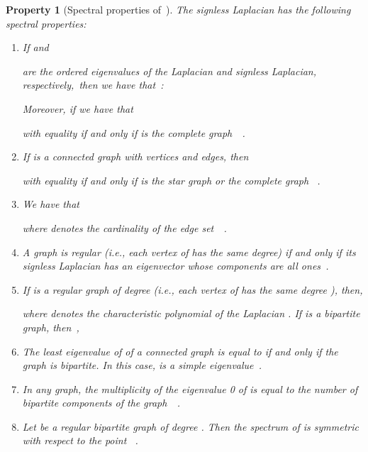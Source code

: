 \documentclass[letterpaper,9pt,twocolumn]{autart}
\newtheorem{property}{\textbf{Property}}
\begin{document}
\begin{property}[Spectral properties of\, ]\label{Prop_Q}
The signless Laplacian  has the following spectral 
properties:
\begin{enumerate} \item 
If  and 

are the ordered eigenvalues of the Laplacian and signless Laplacian,
respectively,~then we have that~\cite{CvetkovicRoSi_LAA07}:

Moreover, if  we have that

with equality if and only if  is the complete graph~~\cite[Th.~3.5]{CvetkovicSi_PIMB09}.

\item If  is a connected graph with  vertices and  edges, then
 
with equality if and only if  is the star graph
 or the complete graph ~\cite[Th.~1]{CvetkovicSi_AADM10}.

\item We have that
 
where  denotes the cardinality of the edge set~~\cite{BrouwerHa_book12}. 

\item A graph  is \emph{regular} (i.e., each vertex
of  has the same degree) if and only if its
signless Laplacian has an eigenvector whose components 
are all ones~\cite[Prop.~2.1]{CvetkovicSi_PIMB09}.

\item If  is a \emph{regular graph} of degree  (i.e., each vertex
of  has the same degree ), then,

where  denotes the characteristic polynomial of the Laplacian .
If  is a \emph{bipartite graph}, then~\cite[Prop.~2.3]{CvetkovicRoSi_LAA07},
 

\item The least eigenvalue of  of a connected graph is equal to
 if and only if the graph is \emph{bipartite}. In this case,  is
a simple eigenvalue~\cite[Prop.~2.1]{CvetkovicRoSi_LAA07}.

\item In any graph, the multiplicity of the eigenvalue 0 of  is equal
to the number of \emph{bipartite components} of the 
graph~~\cite[Prop.~1.3.9]{BrouwerHa_book12}.

\item Let  be a \emph{regular bipartite graph} of degree . Then the
spectrum of  is symmetric with respect to the point 
~\cite[Prop.~2.2]{CvetkovicSi_PIMB09}.~\hfill 
\end{enumerate}
\end{property}
\end{document}
